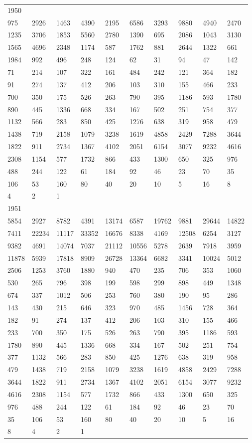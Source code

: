 \begin{longtable}{*{10}{l}}
1950&&&&&&&&&\\
975& 2926& 1463& 4390& 2195& 6586& 3293& 9880& 4940& 2470\\
1235& 3706& 1853& 5560& 2780& 1390& 695& 2086& 1043& 3130\\
1565& 4696& 2348& 1174& 587& 1762& 881& 2644& 1322& 661\\
1984& 992& 496& 248& 124& 62& 31& 94& 47& 142\\
71& 214& 107& 322& 161& 484& 242& 121& 364& 182\\
91& 274& 137& 412& 206& 103& 310& 155& 466& 233\\
700& 350& 175& 526& 263& 790& 395& 1186& 593& 1780\\
890& 445& 1336& 668& 334& 167& 502& 251& 754& 377\\
1132& 566& 283& 850& 425& 1276& 638& 319& 958& 479\\
1438& 719& 2158& 1079& 3238& 1619& 4858& 2429& 7288& 3644\\
1822& 911& 2734& 1367& 4102& 2051& 6154& 3077& 9232& 4616\\
2308& 1154& 577& 1732& 866& 433& 1300& 650& 325& 976\\
488& 244& 122& 61& 184& 92& 46& 23& 70& 35\\
106& 53& 160& 80& 40& 20& 10& 5& 16& 8\\
4& 2& 1& \\

1951&&&&&&&&&\\
5854& 2927& 8782& 4391& 13174& 6587& 19762& 9881& 29644& 14822\\
7411& 22234& 11117& 33352& 16676& 8338& 4169& 12508& 6254& 3127\\
9382& 4691& 14074& 7037& 21112& 10556& 5278& 2639& 7918& 3959\\
11878& 5939& 17818& 8909& 26728& 13364& 6682& 3341& 10024& 5012\\
2506& 1253& 3760& 1880& 940& 470& 235& 706& 353& 1060\\
530& 265& 796& 398& 199& 598& 299& 898& 449& 1348\\
674& 337& 1012& 506& 253& 760& 380& 190& 95& 286\\
143& 430& 215& 646& 323& 970& 485& 1456& 728& 364\\
182& 91& 274& 137& 412& 206& 103& 310& 155& 466\\
233& 700& 350& 175& 526& 263& 790& 395& 1186& 593\\
1780& 890& 445& 1336& 668& 334& 167& 502& 251& 754\\
377& 1132& 566& 283& 850& 425& 1276& 638& 319& 958\\
479& 1438& 719& 2158& 1079& 3238& 1619& 4858& 2429& 7288\\
3644& 1822& 911& 2734& 1367& 4102& 2051& 6154& 3077& 9232\\
4616& 2308& 1154& 577& 1732& 866& 433& 1300& 650& 325\\
976& 488& 244& 122& 61& 184& 92& 46& 23& 70\\
35& 106& 53& 160& 80& 40& 20& 10& 5& 16\\
8& 4& 2& 1& \\


\end{longtable}
